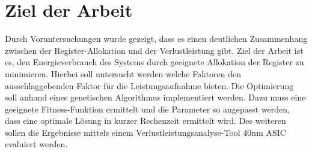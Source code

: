 



\section{Ziel der Arbeit}
\label{sec:ziele}
Durch Voruntersuchungen wurde gezeigt, dass es einen deutlichen Zusammenhang zwischen der Register-Allokation und der Verlustleistung gibt. Ziel der Arbeit ist es, den Energieverbrauch des Systems durch geeignete Allokation der Register zu minimieren. Hierbei soll untersucht werden welche Faktoren den ausschlaggebenden Faktor für die Leistungsaufnahme bieten. Die Optimierung soll anhand eines genetischen Algorithmus implementiert werden. Dazu muss eine geeignete Fitness-Funktion ermittelt und die Parameter so angepasst werden, dass eine optimale Lösung in kurzer Rechenzeit ermittelt wird. Des weiteren sollen die Ergebnisse mittels einem Verlustleistungsanalyse-Tool 40nm ASIC evaluiert werden.

